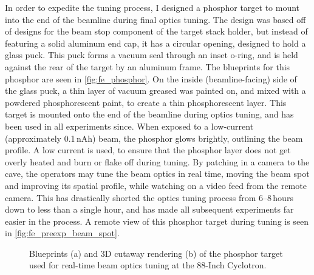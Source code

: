 In order to expedite the tuning process, I designed a phosphor target to mount into the end of the beamline during final optics tuning.
The design was based off of designs for the beam stop component of the target stack holder, but instead of featuring a solid aluminum end cap, it has a circular opening, designed to hold a glass puck.
This puck forms a vacuum seal through an inset o-ring, and is held against the rear of the target by an aluminum frame.
The blueprints for this phosphor are seen in \autoref{fig:fe_phosphor}.
On the inside (beamline-facing) side of the glass puck, a thin layer of vacuum greased was painted on, and mixed with a powdered phosphorescent paint, to create a thin phosphorescent layer.
This target is mounted onto the end of the beamline during optics tuning, and has been used in all experiments since.
When exposed to a low-current (approximately 0.1\,nAh) beam, the phosphor glows brightly, outlining the beam profile.
A low current is used, to ensure that the phosphor layer does not get overly heated and burn or flake off during tuning.
By patching in a camera to the cave, the operators may tune the beam optics in real time, moving the beam spot and improving its spatial profile, while watching on a video feed from the remote camera.
This has drastically shorted the optics tuning process from 6--8\,hours down to less than a single hour, and has made all subsequent experiments far easier in the process.
A remote view of this phosphor target during tuning is seen in \autoref{fig:fe_preexp_beam_spot}.



\begin{figure}
    \centering
    \caption{Blueprints (a) and 3D cutaway rendering (b) of the phosphor target used for real-time beam optics tuning at the 88-Inch Cyclotron.} 
     \label{fig:fe_phosphor}
\end{figure}


